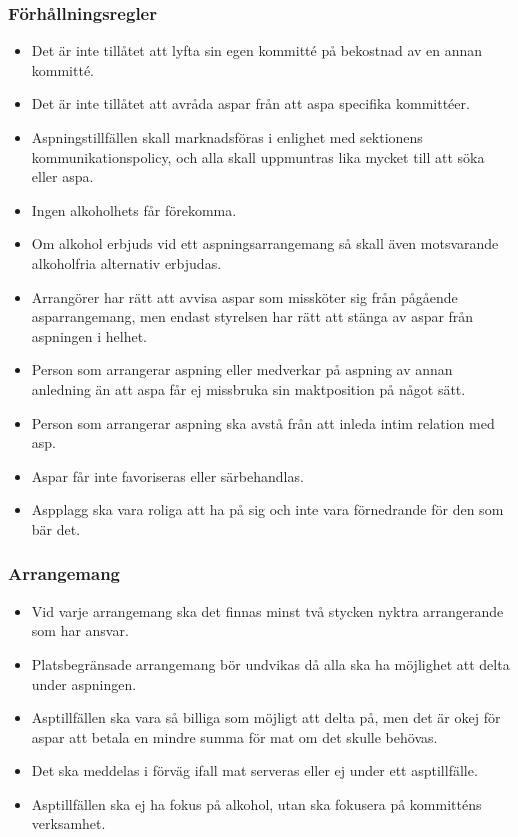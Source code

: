 \subsubsection{Förhållningsregler}
\begin{itemize}
    \item Det är inte tillåtet att lyfta sin egen kommitté på bekostnad av en annan kommitté. 
    \item Det är inte tillåtet att avråda aspar från att aspa specifika kommittéer. 
    \item Aspningstillfällen skall marknadsföras i enlighet med sektionens kommunikationspolicy, och alla skall uppmuntras lika mycket till att söka eller aspa.
    \item Ingen alkoholhets får förekomma. 
    \item Om alkohol erbjuds vid ett aspningsarrangemang så skall även motsvarande alkoholfria alternativ erbjudas.
    \item Arrangörer har rätt att avvisa aspar som missköter sig från pågående asparrangemang, men endast styrelsen har rätt att stänga av aspar från aspningen i helhet.
    \item Person som arrangerar aspning eller medverkar på aspning av annan anledning än att aspa får ej missbruka sin maktposition på något sätt.
    \item Person som arrangerar aspning ska avstå från att inleda intim relation med asp.
    \item Aspar får inte favoriseras eller särbehandlas.
    \item Aspplagg ska vara roliga att ha på sig och inte vara förnedrande för den som bär det. 
\end{itemize}
\subsubsection{Arrangemang}
\begin{itemize}
    \item Vid varje arrangemang ska det finnas minst två stycken nyktra arrangerande som har ansvar. 
    \item Platsbegränsade arrangemang bör undvikas då alla ska ha möjlighet att delta under aspningen.
    \item Asptillfällen ska vara så billiga som möjligt att delta på, men det är okej för aspar att betala en mindre summa för mat om det skulle behövas. 
    \item Det ska meddelas i förväg ifall mat serveras eller ej under ett asptillfälle. 
    \item Asptillfällen ska ej ha fokus på alkohol, utan ska fokusera på kommitténs verksamhet.
\end{itemize}



